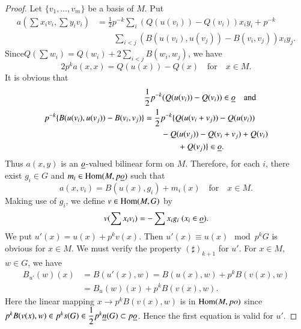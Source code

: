 \begin{proof}
Let $\{v_{1},\ldots,v_{m}\}$ be a basis of $M$. Put
\begin{align*}
a\left(\sum x_{i}v_{i},\sum y_{i}v_{i}\right)
&= \frac{1}{2}p^{-k}\sum_{i}(Q(u(v_{i}))-Q(v_{i}))x_{i}y_{i}+p^{-k}\\
&\qquad\sum_{i<j}(B(u(v_{i}),u(v_{j}))-B(v_{i},v_{j}))x_{i}y_{j}.
\end{align*}
Since\pageoriginale $Q(\sum w_{i})=Q(w_{i})+2\sum\limits_{i<j}B(w_{i},w_{j})$, we
have
$$
2p^{k}a(x,x)=Q(u(x))-Q(x)\quad\text{for}\quad x\in M.
$$
It is obvious that
\begin{align*}
& \frac{1}{2}p^{-k}(Q(u(v_{i}))-Q(v_{i}))\in\underline{o}\quad\text{and}\\
 p^{-k}\{B(u(v_{i}),u(v_{j}))-B(v_{i},v_{j})\}
 &=\frac{1}{2}p^{-k}\{Q(u(v_{i}+v_{j}))-Q(u(v_{i}))\\
&\qquad-Q(u(v_{j}))-Q(v_{i}+v_{j})+Q(v_{i})\\
&\qquad\qquad +Q(v_{j})\}\in\underline{o}.
\end{align*}
Thus $a(x,y)$ is an $\underline{o}$-valued bilinear form on $M$. Therefore,
for each $i$, there exist $g_{i}\in G$ and $m_{i}\in\operatorname{Hom}(M,p\underline{o})$
such that
$$
a(x,v_{i})=B(u(x),g_{i})+m_{i}(x)\quad\text{for}\quad x\in M.
$$
Making use of $g_{i}$, we define $v\in\operatorname{Hom}(M,G)$ by
$$
v(\sum x_{i}v_{i})=-\sum x_{i}g_{i} \; (x_{i}\in\underline{o}).
$$
We put $u'(x)=u(x)+p^{k}v(x)$. Then $u'(x)\equiv u(x)\mod p^{k}G$ is
obvious for $x\in M$. We must verify the property $(\sharp)_{k+1}$ for
$u'$. For $x\in M$, $w\in G$, we have
\begin{align*}
B_{u'}(w)(x) &= B(u'(x),w)=B(u(x),w)+p^{k}B(v(x),w)\\
&= B_{u}(w)(x)+p^{k}B(v(x),w).
\end{align*}
Here the linear mapping $x\to p^{k}B(v(x),w)$ is in $\operatorname{Hom}(M,po)$ since
$p^{k}B(v(x),w)\in p^{k}s(G)\in\dfrac{1}{2}p^{k}\underline{n}(G)\subset
p\underline{o}$. Hence the first equation is valid for $u'$.


\end{proof}
